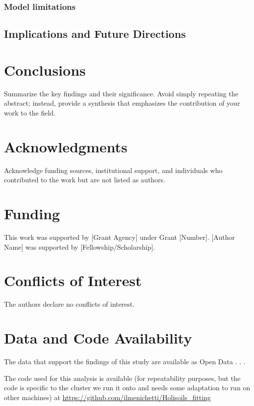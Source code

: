 \documentclass[12pt,a4paper]{article}
\begin{document}
\subsubsection{Model limitations}


\subsection{Implications and Future Directions}



\section{Conclusions}

Summarize the key findings and their significance. Avoid simply repeating the abstract; instead, provide a synthesis that emphasizes the contribution of your work to the field.


\section*{Acknowledgments}

Acknowledge funding sources, institutional support, and individuals who contributed to the work but are not listed as authors.


\section*{Funding}

This work was supported by [Grant Agency] under Grant [Number]. [Author Name] was supported by [Fellowship/Scholarship].


\section*{Conflicts of Interest}

The authors declare no conflicts of interest.


\section*{Data and Code Availability}

The data that support the findings of this study are available as Open Data . . .

The code used for this analysis is available (for repeatability purposes, but the code is specific to the cluster we run it onto and needs some adaptation to run on other machines) at \url{https://github.com/ilmenichetti/Holisoils_fitting}







\end{document}
